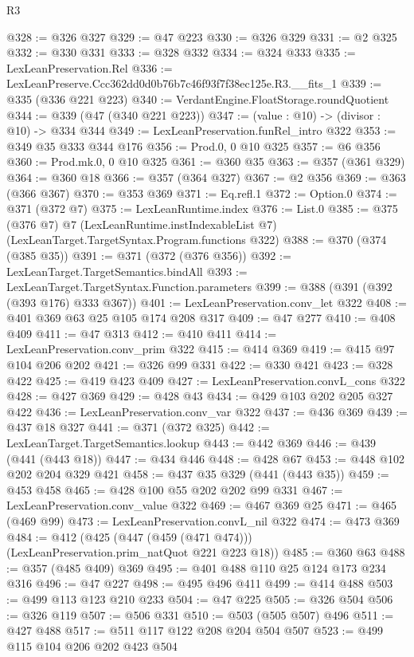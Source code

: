 \begin{lexlean}{R3}
\begin{coremodule}
@328 := @326 @327
@329 := @47 @223
@330 := @326 @329
@331 := @2 @325
@332 := @330 @331
@333 := @328 @332
@334 := @324 @333
@335 := LexLeanPreservation.Rel
@336 := LexLeanPreserve.Ccc362dd0d0b76b7c46f93f7f38ec125e.R3.__fits_1
@339 := @335 (@336 @221 @223)
@340 := VerdantEngine.FloatStorage.roundQuotient
@344 := @339 (@47 (@340 @221 @223))
@347 := (value : @10) -> (divisor : @10) -> @334 @344
@349 := LexLeanPreservation.funRel_intro @322
@353 := @349 @35 @333 @344 @176
@356 := Prod.{0, 0} @10 @325
@357 := @6 @356
@360 := Prod.mk.{0, 0} @10 @325
@361 := @360 @35
@363 := @357 (@361 @329)
@364 := @360 @18
@366 := @357 (@364 @327)
@367 := @2 @356
@369 := @363 (@366 @367)
@370 := @353 @369
@371 := Eq.refl.{1}
@372 := Option.{0}
@374 := @371 (@372 @7)
@375 := LexLeanRuntime.index
@376 := List.{0}
@385 := @375
    (@376 @7)
    @7
    (LexLeanRuntime.instIndexableList @7)
    (LexLeanTarget.TargetSyntax.Program.functions @322)
@388 := @370 (@374 (@385 @35))
@391 := @371 (@372 (@376 @356))
@392 := LexLeanTarget.TargetSemantics.bindAll
@393 := LexLeanTarget.TargetSyntax.Function.parameters
@399 := @388 (@391 (@392 (@393 @176) @333 @367))
@401 := LexLeanPreservation.conv_let @322
@408 := @401 @369 @63 @25 @105 @174 @208 @317
@409 := @47 @277
@410 := @408 @409
@411 := @47 @313
@412 := @410 @411
@414 := LexLeanPreservation.conv_prim @322
@415 := @414 @369
@419 := @415 @97 @104 @206 @202
@421 := @326 @99 @331
@422 := @330 @421
@423 := @328 @422
@425 := @419 @423 @409
@427 := LexLeanPreservation.convL_cons @322
@428 := @427 @369
@429 := @428 @43
@434 := @429 @103 @202 @205 @327 @422
@436 := LexLeanPreservation.conv_var @322
@437 := @436 @369
@439 := @437 @18 @327
@441 := @371 (@372 @325)
@442 := LexLeanTarget.TargetSemantics.lookup
@443 := @442 @369
@446 := @439 (@441 (@443 @18))
@447 := @434 @446
@448 := @428 @67
@453 := @448 @102 @202 @204 @329 @421
@458 := @437 @35 @329 (@441 (@443 @35))
@459 := @453 @458
@465 := @428 @100 @55 @202 @202 @99 @331
@467 := LexLeanPreservation.conv_value @322
@469 := @467 @369 @25
@471 := @465 (@469 @99)
@473 := LexLeanPreservation.convL_nil @322
@474 := @473 @369
@484 := @412 (@425 (@447 (@459 (@471 @474))) (LexLeanPreservation.prim_natQuot @221 @223 @18))
@485 := @360 @63
@488 := @357 (@485 @409) @369
@495 := @401 @488 @110 @25 @124 @173 @234 @316
@496 := @47 @227
@498 := @495 @496 @411
@499 := @414 @488
@503 := @499 @113 @123 @210 @233
@504 := @47 @225
@505 := @326 @504
@506 := @326 @119
@507 := @506 @331
@510 := @503 (@505 @507) @496
@511 := @427 @488
@517 := @511 @117 @122 @208 @204 @504 @507
@523 := @499 @115 @104 @206 @202 @423 @504

\end{coremodule}
\end{lexlean}
